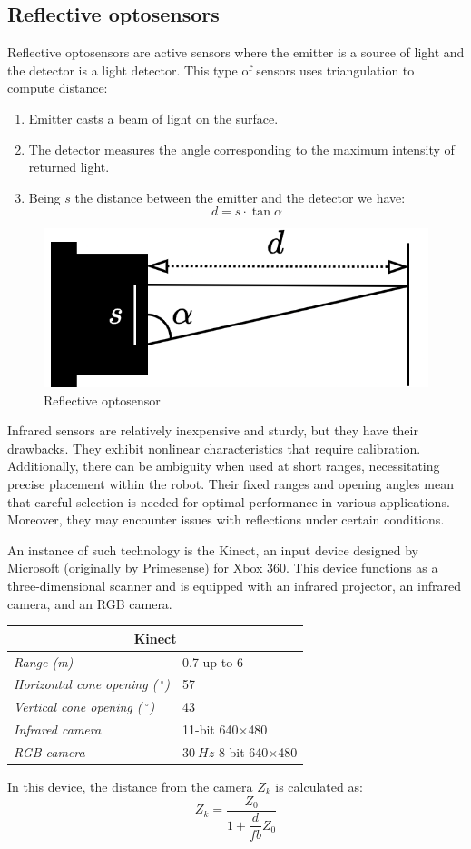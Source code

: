 \subsection{Reflective optosensors}
Reflective optosensors are active sensors where the emitter is a source of light and the detector is a light detector. 
This type of sensors uses triangulation to compute distance: 
\begin{enumerate}
    \item Emitter casts a beam of light on the surface. 
    \item The detector measures the angle corresponding to the maximum intensity of returned light. 
    \item Being $s$ the distance between the emitter and the detector we have: 
    \[d=s \cdot \tan \alpha\]
\end{enumerate}
\begin{figure}[H]
    \centering
    \includegraphics[width=0.35\linewidth]{images/opto.png}
    \caption{Reflective optosensor}
\end{figure}
Infrared sensors are relatively inexpensive and sturdy, but they have their drawbacks. 
They exhibit nonlinear characteristics that require calibration.
Additionally, there can be ambiguity when used at short ranges, necessitating precise placement within the robot. 
Their fixed ranges and opening angles mean that careful selection is needed for optimal performance in various applications. 
Moreover, they may encounter issues with reflections under certain conditions.

An instance of such technology is the Kinect, an input device designed by Microsoft (originally by Primesense) for Xbox 360.
This device functions as a three-dimensional scanner and is equipped with an infrared projector, an infrared camera, and an RGB camera.
\begin{table}[H]
    \centering
    \begin{tabular}{ll}
    \multicolumn{2}{c}{\textbf{Kinect}}                                                         \\ \hline
    \multicolumn{1}{l|}{\textit{Range (m)}}                             & 0.7 up to 6           \\
    \multicolumn{1}{l|}{\textit{Horizontal cone opening ($\:^\circ$)}}  & 57                    \\
    \multicolumn{1}{l|}{\textit{Vertical cone opening ($\:^\circ$)}}    & 43                    \\
    \multicolumn{1}{l|}{\textit{Infrared camera}}                       & 11-bit 640$\times$480        \\    
    \multicolumn{1}{l|}{\textit{RGB camera}}                            & $30\:Hz$ 8-bit 640$\times$480    \\  
    \end{tabular}
\end{table}
In this device, the distance from the camera $Z_k$ is calculated as:
\[Z_k=\dfrac{Z_0}{1+\dfrac{d}{fb}Z_0}\]

